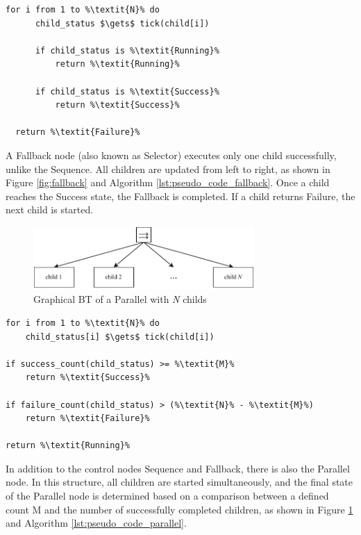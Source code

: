   \begin{lstlisting}[float=h]
  for i from 1 to %\textit{N}% do
      child_status $\gets$ tick(child[i])
      
      if child_status is %\textit{Running}%
          return %\textit{Running}%
          
      if child_status is %\textit{Success}%
          return %\textit{Success}%
  
  return %\textit{Failure}%
  \end{lstlisting}

  A Fallback node (also known as Selector) executes only one child successfully, unlike the Sequence. All children are updated from left to right, as shown in Figure \ref{fig:fallback} and Algorithm \ref{lst:pseudo_code_fallback}. Once a child reaches the Success state, the Fallback is completed. If a child returns Failure, the next child is started.

\begin{figure}[h]
    \centering
    \includegraphics[width=0.75\textwidth]{figures/20_state_of_the_art/parallel.pdf}
    \caption{Graphical BT of a Parallel with \textit{N} childs}
    \label{fig:parallel}
\end{figure}
  
\begin{lstlisting}[float=h]
for i from 1 to %\textit{N}% do
    child_status[i] $\gets$ tick(child[i])
    
if success_count(child_status) >= %\textit{M}%
    return %\textit{Success}%
        
if failure_count(child_status) > (%\textit{N}% - %\textit{M}%)
    return %\textit{Failure}%

return %\textit{Running}%
\end{lstlisting}

In addition to the control nodes Sequence and Fallback, there is also the Parallel node. In this structure, all children are started simultaneously, and the final state of the Parallel node is determined based on a comparison between a defined count M and the number of successfully completed children, as shown in Figure \ref{fig:parallel} and Algorithm \ref{lst:pseudo_code_parallel}.

